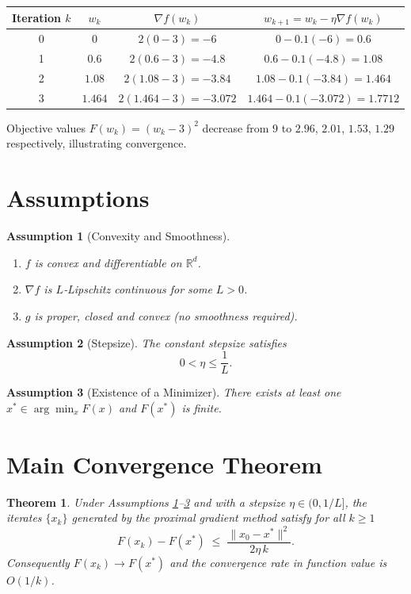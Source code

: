 \documentclass{article}
\newtheorem{theorem}{Theorem}
\newtheorem{assumption}{Assumption}
\begin{document}
\begin{center}
\begin{tabular}{c|c|c|c}
Iteration $k$ & $w_{k}$ & $\nabla f(w_{k})$ & $w_{k+1}=w_{k}-\eta\nabla f(w_{k})$\\ \hline
0 & $0$ & $2(0-3)=-6$ & $0-0.1(-6)=0.6$\\
1 & $0.6$ & $2(0.6-3)=-4.8$ & $0.6-0.1(-4.8)=1.08$\\
2 & $1.08$ & $2(1.08-3)=-3.84$ & $1.08-0.1(-3.84)=1.464$\\
3 & $1.464$ & $2(1.464-3)=-3.072$ & $1.464-0.1(-3.072)=1.7712$
\end{tabular}
\end{center}
Objective values $F(w_{k})=(w_{k}-3)^{2}$ decrease from $9$ to $2.96$, $2.01$, $1.53$, $1.29$ respectively, illustrating convergence.

\newpage
\section*{Assumptions}
\begin{assumption}[Convexity and Smoothness]\label{ass:convex}
\begin{enumerate}
\item $f$ is convex and differentiable on $\mathbb{R}^{d}$.
\item $\nabla f$ is $L$‑Lipschitz continuous for some $L>0$.
\item $g$ is proper, closed and convex (no smoothness required).
\end{enumerate}
\end{assumption}
\begin{assumption}[Stepsize]\label{ass:stepsize}
The constant stepsize satisfies  
\[
0<\eta\le \frac{1}{L}.
\]
\end{assumption}
\begin{assumption}[Existence of a Minimizer]\label{ass:opt}
There exists at least one $x^{*}\in\arg\min_{x}F(x)$ and $F(x^{*})$ is finite.
\end{assumption}

\section*{Main Convergence Theorem}
\begin{theorem}\label{thm:rate}
Under Assumptions \ref{ass:convex}–\ref{ass:opt} and with a stepsize $\eta\in(0,1/L]$, the iterates $\{x_{k}\}$ generated by the proximal gradient method satisfy for all $k\ge 1$
\[
F(x_{k})-F(x^{*})\;\le\;\frac{\|x_{0}-x^{*}\|^{2}}{2\eta\,k}.
\]
Consequently $F(x_{k})\to F(x^{*})$ and the convergence rate in function value is $O(1/k)$.
\end{theorem}
\end{document}
